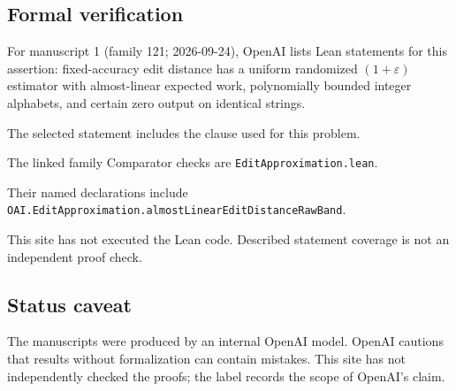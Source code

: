 \documentclass[11pt]{article}
\begin{document}
\subsection{Formal verification}
For manuscript 1 (family 121; 2026-09-24), OpenAI lists Lean statements for this assertion: fixed-accuracy edit distance has a uniform randomized $(1+\varepsilon)$ estimator with almost-linear expected work, polynomially bounded integer alphabets, and certain zero output on identical strings.

The selected statement includes the clause used for this problem.

The linked family Comparator checks are \texttt{EditApproximation.lean}.

Their named declarations include \texttt{OAI.EditApproximation.almostLinearEditDistanceRawBand}.

This site has not executed the Lean code. Described statement coverage is not an independent proof check.

\subsection{Status caveat}
The manuscripts were produced by an internal OpenAI model. OpenAI cautions that results without formalization can contain mistakes. This site has not independently checked the proofs; the label records the scope of OpenAI's claim.
\end{document}

